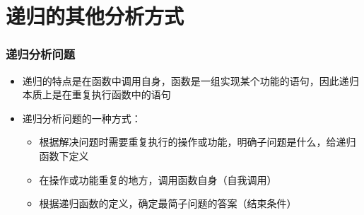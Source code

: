 \begin{frame}[fragile]
     {
        
    }

\end{frame}


\section{递归的其他分析方式}

\begin{frame}[fragile]
    \frametitle{递归分析问题}

    \begin{itemize}
        \item 递归的特点是在函数中调用自身，函数是一组实现某个功能的语句，因此递归本质上是在重复执行函数中的语句
        \item 递归分析问题的一种方式：
            \begin{itemize}
                \item 根据解决问题时需要重复执行的操作或功能，明确子问题是什么，给递归函数下定义
                \item 在操作或功能重复的地方，调用函数自身（自我调用）
                \item 根据递归函数的定义，确定最简子问题的答案（结束条件）
            \end{itemize}
    \end{itemize}
    
\end{frame}

